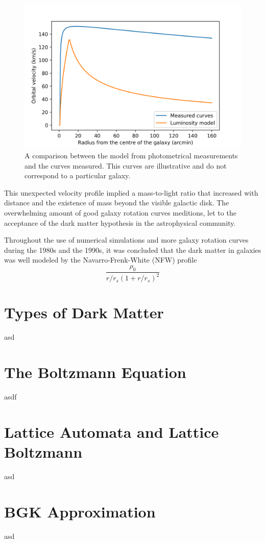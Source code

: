 \begin{figure}[H]
    \centering
    \includegraphics[scale=0.8]{imag/galaxyRotCurv.png}
    \caption{A comparison between the model from photometrical measurements and the curves measured. This curves are illustrative and do not correspond to a particular galaxy.}
    \label{galaxyCurve}
\end{figure}


This unexpected velocity profile implied a mass-to-light ratio that increased with distance and the existence of mass beyond the visible galactic disk\cite{theIsMassOutside}. The overwhelming amount of good galaxy rotation curves meditions, let to the acceptance of the dark matter hypothesis in the astrophysical community.

Throughout the use of numerical simulations and more galaxy rotation curves during the 1980s and the 1990s, it was concluded that the dark matter in galaxies was well modeled by the Navarro-Frenk-White (NFW) profile\cite{FWN}\cite{mariangela}\\
\begin{equation}
\frac{\rho_0}{r/r_s(1+r/r_s)^2}
\end{equation}


\section{Types of Dark Matter}
asd
\section{The Boltzmann Equation}
asdf
\section{Lattice Automata and Lattice Boltzmann}
asd
\section{BGK Approximation}
\label{bgk}
asd
